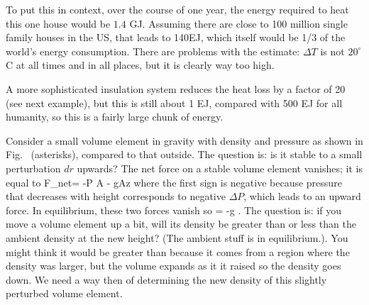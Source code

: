\documentclass[11pt]{book}
\begin{document}
To put this in context, over the course of one year, the energy required to heat this one house would be $1.4$ GJ. Assuming there are close to 100 million single family houses in the US, that leads to 140EJ, which itself would be 1/3 of the world's energy consumption. There are problems with the estimate: $\Delta T$ is not $20^\circ$C at all times and in all places, but it is clearly way too high. 

A more sophisticated insulation system reduces the heat loss by a factor of 20 (see next example), but this is still about 1 EJ, compared with 500 EJ for all humanity, so this is a fairly large chunk of energy.



Consider a small volume element in gravity with density and pressure as shown in Fig.~ (asterisks), compared to that outside. The question is: is it stable to a small perturbation $dr$ upwards? The net force on a stable volume element vanishes; it is equal to 
\be
\Delta F_{net}= -\Delta P A - g\rho A\Delta z
\ee
where the first sign is negative because pressure that decreases with height corresponds to negative $\Delta P$, which leads to an upward force. In equilibrium, these two forces vanish so
\be
{} = -g\rho
.\ee
The question is: if you move a volume element up a bit, will its density be greater than or less than the ambient density at the new height? (The ambient stuff is in equilibrium.). You might think it would be greater than because it comes from a region where the density was larger, but the volume expands as it it raised so the density goes down. We need a way then of determining the new density of this slightly perturbed volume element.
\end{document}
